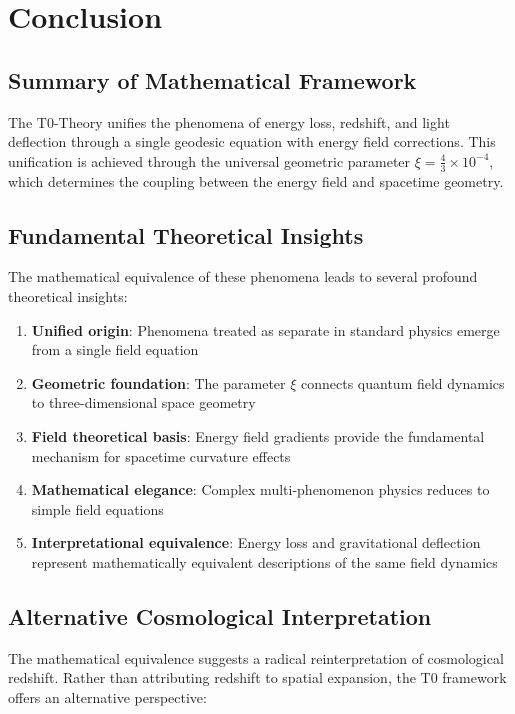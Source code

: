 \documentclass[12pt,a4paper]{article}
\theoremstyle{definition}
\begin{document}
	\section{Conclusion}
	
	\subsection{Summary of Mathematical Framework}
	
	The T0-Theory unifies the phenomena of energy loss, redshift, and light deflection through a single geodesic equation with energy field corrections. This unification is achieved through the universal geometric parameter $\xi = \frac{4}{3} \times 10^{-4}$, which determines the coupling between the energy field and spacetime geometry.
	
	\subsection{Fundamental Theoretical Insights}
	
	The mathematical equivalence of these phenomena leads to several profound theoretical insights:
	
	\begin{enumerate}
		\item \textbf{Unified origin}: Phenomena treated as separate in standard physics emerge from a single field equation
		\item \textbf{Geometric foundation}: The parameter $\xi$ connects quantum field dynamics to three-dimensional space geometry
		\item \textbf{Field theoretical basis}: Energy field gradients provide the fundamental mechanism for spacetime curvature effects
		\item \textbf{Mathematical elegance}: Complex multi-phenomenon physics reduces to simple field equations
		\item \textbf{Interpretational equivalence}: Energy loss and gravitational deflection represent mathematically equivalent descriptions of the same field dynamics
	\end{enumerate}
	
	\subsection{Alternative Cosmological Interpretation}
	
	The mathematical equivalence suggests a radical reinterpretation of cosmological redshift. Rather than attributing redshift to spatial expansion, the T0 framework offers an alternative perspective:
	
\end{document}
